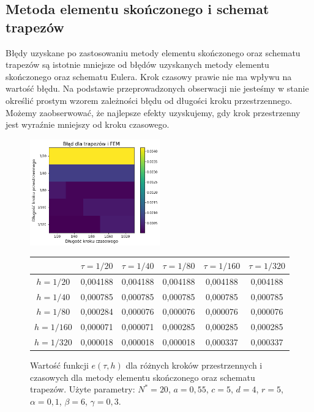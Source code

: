 \documentclass{article}
\begin{document}
\subsection{Metoda elementu skończonego i schemat trapezów}
Błędy uzyskane po zastosowaniu metody elementu skończonego oraz schematu trapezów są istotnie mniejsze od błędów uzyskanych metody elementu skończonego oraz schematu Eulera. Krok czasowy prawie nie ma wpływu na wartość błędu. Na podstawie przeprowadzonych obserwacji nie jesteśmy w stanie określić prostym wzorem zależności błędu od długości kroku przestrzennego. Możemy zaobserwować, że najlepsze efekty uzyskujemy, gdy krok przestrzenny jest wyraźnie mniejszy od kroku czasowego.
\begin{figure}[h!]
	\caption{Wartość funkcji $e(\tau,h)$ dla różnych kroków przestrzennych i czasowych dla metody elementu skończonego oraz schematu trapezów. Użyte parametry: $N^{*}=20$, $a=0,55$, $c=5$, $d=4$, $r=5$, $\alpha=0,1$, $\beta=6$, $\gamma=0,3$. }
	\centering
	\includegraphics[width=0.5\textwidth]{images/blad_fem_trapezy.pdf}
	\begin{tabular}{|c|c|c|c|c|c|}
		\hline
		&    $\tau=1/20$ &    $\tau=1/40$ &    $\tau=1/80$ &   $\tau=1/160$ &   $\tau=1/320$ \\
		\hline 
		$h=1/20$  &  0,004188 &	0,004188 &	0,004188 &	0,004188 &	0,004188 \\
		\hline
		$h=1/40$  &  0,000785 &	0,000785 &	0,000785 &	0,000785 &	0,000785 \\
		\hline
		$h=1/80$  &  0,000284 &	0,000076 &	0,000076 &	0,000076 &	0,000076 \\
		\hline
		$h=1/160$ &  0,000071 &	0,000071 &	0,000285 &	0,000285 &	0,000285 \\
		\hline
		$h=1/320$ &  0,000018 &	0,000018 &	0,000018 &	0,000337 &	0,000337 \\
		\hline
	\end{tabular}
\end{figure}
\end{document}
